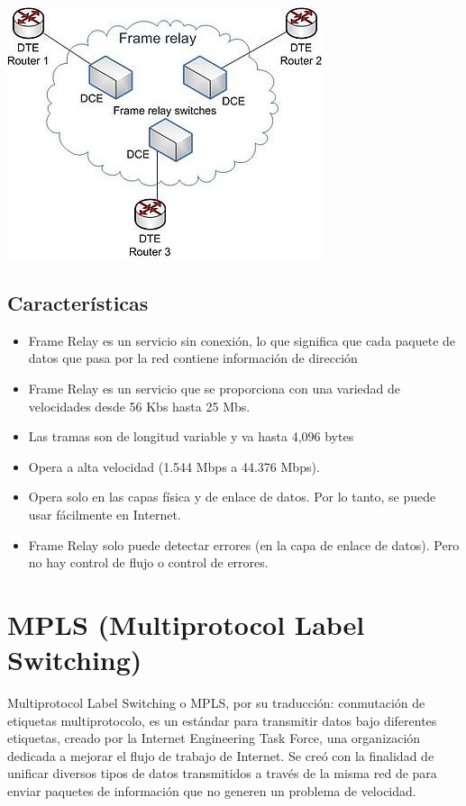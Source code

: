 \begin{center}
\includegraphics[scale=0.66]{Imagenes/FR.jpg}
\end{center}

\subsection*{Características}
\begin{itemize}
\item Frame Relay es un servicio sin conexión, lo que significa que cada paquete de datos que pasa por la red contiene información de dirección
\item Frame Relay es un servicio que se proporciona con una variedad de velocidades desde 56 Kbs hasta 25 Mbs. 
\item Las tramas son de longitud variable y va hasta 4,096 bytes
\item Opera a alta velocidad (1.544 Mbps a 44.376 Mbps).
\item Opera solo en las capas física y de enlace de datos. Por lo tanto, se puede usar fácilmente en Internet.
\item Frame Relay solo puede detectar errores (en la capa de enlace de datos). Pero no hay control de flujo o control de errores.


\end{itemize}

\section*{MPLS (Multiprotocol Label Switching)}
Multiprotocol Label Switching o MPLS, por su traducción: conmutación de etiquetas multiprotocolo, es un estándar para transmitir datos bajo diferentes etiquetas, creado por la Internet Engineering Task Force, una organización dedicada a mejorar el flujo de trabajo de Internet. Se creó con la finalidad de unificar diversos tipos de datos transmitidos a través de la misma red de para enviar paquetes de información que no generen un problema de velocidad. 

